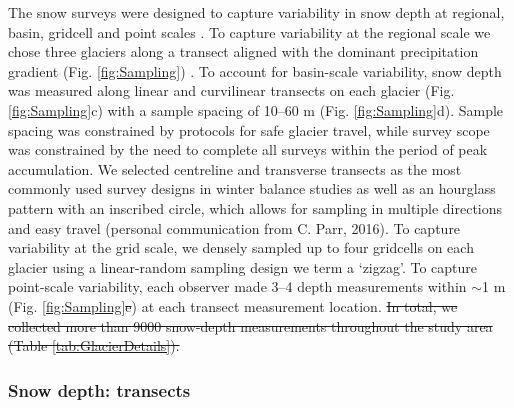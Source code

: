 \documentclass[review,oneside, letterpaper]{igs} %
\providecommand{\DIFadd}[1]{{\protect\color{blue}\uwave{#1}}} %
\providecommand{\DIFdel}[1]{{\protect\color{red}\sout{#1}}}                      %
\providecommand{\DIFaddbegin}{} %
\providecommand{\DIFaddend}{} %
\providecommand{\DIFdelbegin}{} %
\providecommand{\DIFdelend}{} %
\newcommand{\DIFscaledelfig}{0.5}
\newlength{\DIFdelgraphicswidth} %
\newlength{\DIFdelgraphicsheight} %
\newcommand{\DIFaddincludegraphics}[2][]{{\color{blue}\fbox{\DIFOincludegraphics[#1]{#2}}}} %
\newcommand{\DIFdelincludegraphics}[2][]{%
\sbox{\DIFdelgraphicsbox}{\DIFOincludegraphics[#1]{#2}}%
\settoboxwidth{\DIFdelgraphicswidth}{\DIFdelgraphicsbox} %
\settoboxtotalheight{\DIFdelgraphicsheight}{\DIFdelgraphicsbox} %
\scalebox{\DIFscaledelfig}{%
\parbox[b]{\DIFdelgraphicswidth}{\usebox{\DIFdelgraphicsbox}\\[-\baselineskip] \rule{\DIFdelgraphicswidth}{0em}}\llap{\resizebox{\DIFdelgraphicswidth}{\DIFdelgraphicsheight}{%
\setlength{\unitlength}{\DIFdelgraphicswidth}%
\begin{picture}(1,1)%
\thicklines\linethickness{2pt} %
{\color[rgb]{1,0,0}\put(0,0){\framebox(1,1){}}}%
{\color[rgb]{1,0,0}\put(0,0){\line( 1,1){1}}}%
{\color[rgb]{1,0,0}\put(0,1){\line(1,-1){1}}}%
\end{picture}%
}\hspace*{3pt}}} %
} %
\DeclareRobustCommand{\DIFaddbegin}{\DIFOaddbegin \let\includegraphics\DIFaddincludegraphics} %
\DeclareRobustCommand{\DIFaddend}{\DIFOaddend \let\includegraphics\DIFOincludegraphics} %
\DeclareRobustCommand{\DIFdelbegin}{\DIFOdelbegin \let\includegraphics\DIFdelincludegraphics} %
\DeclareRobustCommand{\DIFdelend}{\DIFOaddend \let\includegraphics\DIFOincludegraphics} %
\begin{document}
The snow surveys were designed to capture variability in snow depth at regional, basin, gridcell and point scales \citep{Clark2011}. To capture variability at the regional scale we chose three glaciers along a transect aligned with the dominant precipitation gradient  (Fig. \ref{fig:Sampling}\DIFaddbegin \DIFadd{b}\DIFaddend ) \citep{Taylor1969}. To account for basin-scale variability, snow depth was measured along linear and curvilinear transects on each glacier (Fig. \ref{fig:Sampling}c) with a sample spacing of 10--60 m (Fig. \ref{fig:Sampling}d). Sample spacing was constrained by protocols for safe glacier travel, while survey scope was constrained by the need to complete all surveys within the period of peak accumulation. We selected centreline and transverse transects as the most commonly used survey designs in winter balance studies \citep[e.g.][]{Kaser2003, Machguth2006} as well as an hourglass pattern with an inscribed circle, which allows for sampling in multiple directions and easy travel (personal communication from C. Parr, 2016). To capture variability at the grid scale, we densely sampled up to four gridcells on each glacier using a linear-random sampling design \DIFaddbegin \DIFadd{\mbox{%
\citep{Shea2010} }\hspace{0pt}%
}\DIFaddend we term a `zigzag'. To capture point-scale variability, each observer made 3--4 depth measurements within $\sim$1 m (Fig. \ref{fig:Sampling}\DIFdelbegin \DIFdel{e}\DIFdelend \DIFaddbegin \DIFadd{f}\DIFaddend ) at each transect measurement location. 
\DIFdelbegin \DIFdel{In total, we collected more than 9000 snow-depth measurements throughout the study area (Table \ref{tab:GlacierDetails}). 
}\DIFdelend 

\subsubsection{Snow depth: transects}
\end{document}
